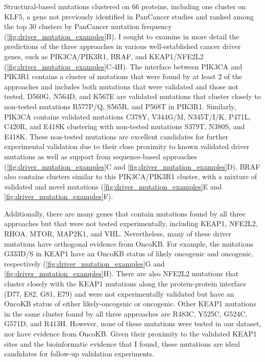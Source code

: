 Structural-based mutations clustered on 66 proteins, including one cluster on KLF5, a gene not previously identified in PanCancer studies and ranked among the top 30 clusters by PanCancer mutation frequency (\autoref{fig:driver_mutation_examples}B). I sought to examine in more detail the predictions of the three approaches in various well-established cancer driver genes, such as PIK3CA/PIK3R1, BRAF, and KEAP1/NFE2L2 (\autoref{fig:driver_mutation_examples}C-4H). The interface between PIK3CA and PIK3R1 contains a cluster of mutations that were found by at least 2 of the approaches and includes both mutations that were validated and those not tested. D560G, N564D, and K567E are validated mutations that cluster closely to non-tested mutations R577P/Q, S565R, and P568T in PIK3R1. Similarly, PIK3CA contains validated mutations C378Y, V344G/M, N345T/I/K, P471L, C420R, and E418K clustering with non-tested mutations S379T, N380S, and E418K. These non-tested mutations are excellent candidates for further experimental validation due to their close proximity to known validated driver mutations as well as support from sequence-based approaches (\autoref{fig:driver_mutation_examples}C and \ref{fig:driver_mutation_examples}D). BRAF also contains clusters similar to this PIK3CA/PIK3R1 cluster, with a mixture of validated and novel mutations (\autoref{fig:driver_mutation_examples}E and \autoref{fig:driver_mutation_examples}F). 

Additionally, there are many genes that contain mutations found by all three approaches but that were not tested experimentally, including KEAP1, NFE2L2, RHOA, MTOR, MAP2K1, and VHL. Nevertheless, many of these driver mutations have orthogonal evidence from OncoKB. For example, the mutations G333D/S in KEAP1 have an OncoKB status of likely oncogenic and oncogenic, respectively (\autoref{fig:driver_mutation_examples}G and \ref{fig:driver_mutation_examples}H). There are also NFE2L2 mutations that cluster closely with the KEAP1 mutations along the protein-protein interface (D77, E82, G81, E79) and were not experimentally validated but have an OncoKB status of either likely-oncogenic or oncogenic. Other KEAP1 mutations in the same cluster found by all three approaches are R483C, Y525C, G524C, G571D, and R413H. However, none of these mutations were tested in our dataset, nor have evidence from OncoKB. Given their proximity to the validated KEAP1 sites and the bioinformatic evidence that I found, these mutations are ideal candidates for follow-up validation experiments. 

